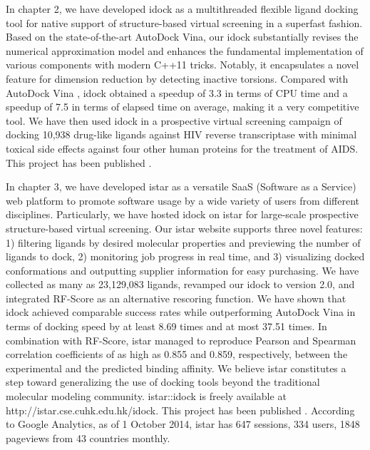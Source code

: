 In chapter 2, we have developed idock \citep{1153} as a multithreaded flexible ligand docking tool for native support of structure-based virtual screening in a superfast fashion. Based on the state-of-the-art AutoDock Vina, our idock substantially revises the numerical approximation model and enhances the fundamental implementation of various components with modern C++11 tricks. Notably, it encapsulates a novel feature for dimension reduction by detecting inactive torsions. Compared with AutoDock Vina \citep{595}, idock obtained a speedup of 3.3 in terms of CPU time and a speedup of 7.5 in terms of elapsed time on average, making it a very competitive tool. We have then used idock in a prospective virtual screening campaign of docking 10,938 drug-like ligands against HIV reverse transcriptase with minimal toxical side effects against four other human proteins for the treatment of AIDS. This project has been published \citep{1153}.

In chapter 3, we have developed istar \citep{1362} as a versatile SaaS (Software as a Service) web platform to promote software usage by a wide variety of users from different disciplines. Particularly, we have hosted idock on istar for large-scale prospective structure-based virtual screening. Our istar website supports three novel features: 1) filtering ligands by desired molecular properties and previewing the number of ligands to dock, 2) monitoring job progress in real time, and 3) visualizing docked conformations and outputting supplier information for easy purchasing. We have collected as many as 23,129,083 ligands, revamped our idock to version 2.0, and integrated RF-Score \citep{564} as an alternative rescoring function. We have shown that idock achieved comparable success rates while outperforming AutoDock Vina in terms of docking speed by at least 8.69 times and at most 37.51 times. In combination with RF-Score, istar managed to reproduce Pearson and Spearman correlation coefficients of as high as 0.855 and 0.859, respectively, between the experimental and the predicted binding affinity. We believe istar constitutes a step toward generalizing the use of docking tools beyond the traditional molecular modeling community. istar::idock is freely available at http://istar.cse.cuhk.edu.hk/idock. This project has been published \citep{1362}. According to Google Analytics, as of 1 October 2014, istar has 647 sessions, 334 users, 1848 pageviews from 43 countries monthly.

